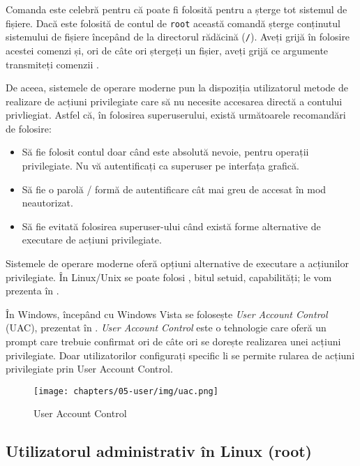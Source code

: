 \begin{note}[Comanda rm -fr /]
Comanda  este celebră pentru că poate fi folosită pentru a șterge tot sistemul de fișiere. Dacă este folosită de contul de \texttt{root} această comandă șterge conținutul sistemului de fișiere începând de la directorul rădăcină (\texttt{/}). Aveți grijă în folosire acestei comenzi și, ori de câte ori ștergeți un fișier, aveți grijă ce argumente transmiteți comenzii .
\end{note}

De aceea, sistemele de operare moderne pun la dispoziția utilizatorul metode de
realizare de acțiuni privilegiate care să nu necesite accesarea directă a
contului privliegiat. Astfel că, în folosirea superuserului, există următoarele
recomandări de folosire:

\begin{itemize}
	\item Să fie folosit contul doar când este absolută nevoie, pentru
		operații privilegiate. Nu vă autentificați ca superuser pe
		interfața grafică.
	\item Să fie o parolă / formă de autentificare cât mai greu de accesat
		în mod neautorizat.
	\item Să fie evitată folosirea superuser-ului când există forme
		alternative de executare de acțiuni privilegiate.
\end{itemize}

Sistemele de operare moderne oferă opțiuni alternative de executare a acțiunilor
privilegiate. În Linux/Unix se poate folosi , bitul setuid, capabilități; le
vom prezenta în .

În Windows, începând cu Windows Vista se folosește \textit{User Account Control}
(UAC), prezentat în . \textit{User Account Control} este o tehnologie
care oferă un prompt care trebuie confirmat ori de câte ori se dorește
realizarea unei acțiuni privilegiate. Doar utilizatorilor configurați specific
li se permite rularea de acțiuni privilegiate prin User Account Control.

\begin{figure}[!htbp]
  \centering
  \texttt{[image: chapters/05-user/img/uac.png]}
  \caption{User Account Control}
  \label{fig:user:uac}
\end{figure}

\subsection{Utilizatorul administrativ în Linux (root)}
\label{sec:user:root}

